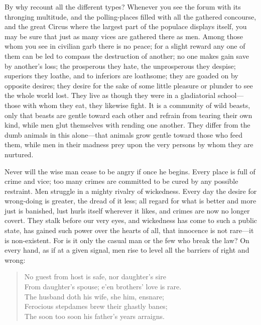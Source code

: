 By why recount all the different types? Whenever you see the forum
with its thronging multitude, and the polling-places filled with all
the gathered concourse, and the great Circus where the largest part of
the populace displays itself, you may be sure that just as many vices
are gathered there as men. Among those whom you see in civilian garb
there is no peace; for a slight reward any one of them can be led to
compass the destruction of another; no one makes gain save by
another's loss; the prosperous they hate, the unprosperous they
despise; superiors they loathe, and to inferiors are loathsome; they
are goaded on by opposite desires; they desire for the sake of some
little pleasure or plunder to see the whole world lost. They live as
though they were in a gladiatorial school---those with whom they eat,
they likewise fight. It is a community of wild beasts, only that
beasts are gentle toward each other and refrain from tearing their own
kind, while men  glut themselves with rending one another.
They differ from the dumb animals in this a\-lone---that animals grow
gentle toward those who feed them, while men in their madness prey
upon the very persons by whom they are nurtured.

Never will the wise man cease to be angry if once he begins. Every
place is full of crime and vice; too many crimes are committed to be
cured by any possible restraint. Men struggle in a mighty rivalry of
wickedness. Every day the desire for wrong-doing is greater, the dread
of it less; all regard for what is better and more just is banished,
lust hurls itself wherever it likes, and crimes are now no longer
covert. They stalk before our very eyes, and wickedness has come to
such a public state, has gained such power over the hearts of all,
that innocence is not rare---it is non-existent. For is it only the
casual man or the few who break the law? On every hand, as if at a
given signal, men rise to level all the barriers of right and wrong:

\begin{verse}
No guest from host is safe, nor daughter's sire\\
From daughter's spouse; e'en brothers' love is rare.\\
The husband doth his wife, she him, ensnare;\\
Ferocious stepdames brew their ghastly banes;\\
The soon too soon his father's years arraigns.
\end{verse}


